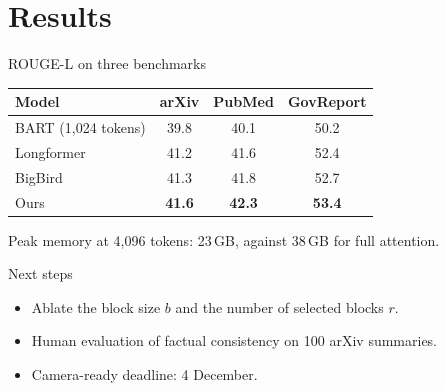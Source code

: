 \documentclass[aspectratio=169]{beamer}
\begin{document}
\section{Results}

\begin{frame}{ROUGE-L on three benchmarks}
  \centering
  \begin{tabular}{lccc}
    \toprule
    Model & arXiv & PubMed & GovReport \\
    \midrule
    BART (1{,}024 tokens) & 39.8 & 40.1 & 50.2 \\
    Longformer & 41.2 & 41.6 & 52.4 \\
    BigBird & 41.3 & 41.8 & 52.7 \\
    Ours & \textbf{41.6} & \textbf{42.3} & \textbf{53.4} \\
    \bottomrule
  \end{tabular}

  \vspace{1em}
  Peak memory at 4{,}096 tokens: 23\,GB, against 38\,GB for full attention.
\end{frame}

\begin{frame}{Next steps}
  \begin{itemize}
    \item Ablate the block size $b$ and the number of selected blocks $r$.
    \item Human evaluation of factual consistency on 100 arXiv summaries.
    \item Camera-ready deadline: 4 December.
  \end{itemize}
\end{frame}
\end{document}
